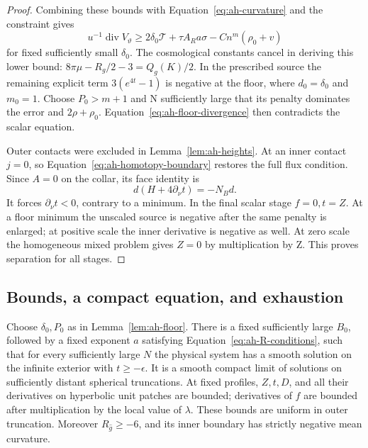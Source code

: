 \begin{proof}
Combining these bounds with
Equation~\eqref{eq:ah-curvature} and the constraint gives
\begin{equation}\label{eq:ah-floor-divergence}
 u^{-1}\operatorname{div}V_\vartheta
 \ge 2\delta_0\mathcal T+\tau A_Ra\sigma
                  -Cn^m(\rho_0+v)
\end{equation}
for fixed sufficiently small \(\delta_0\).
The cosmological constants cancel in deriving this lower bound:
\(8\pi\mu-R_g/2-3=Q_g(K)/2\).
In the prescribed source the remaining explicit term
\(3(e^{4t}-1)\) is negative at the floor, where \(d_0=\delta_0\)
and \(m_0=1\).  Choose \(P_0>m+1\) and N sufficiently large
that its penalty dominates the error and \(2\rho+\rho_0\).
Equation~\eqref{eq:ah-floor-divergence} then contradicts the
scalar equation.

Outer contacts were excluded in Lemma~\ref{lem:ah-heights}.
At an inner contact \(j=0\), so
Equation~\eqref{eq:ah-homotopy-boundary} restores the full flux
condition.  Since \(A=0\) on the collar, its face identity is
\[
 d(H+4\partial_\nu t)=-N_Bd.
\]
It forces \(\partial_\nu t<0\), contrary to a minimum.
In the final scalar stage \(f=0,t=Z\).  At a floor minimum the
unscaled source is negative after the same penalty is enlarged;
at positive scale the inner derivative is negative as well.
At zero scale the homogeneous mixed problem gives \(Z=0\) by
multiplication by Z.  This proves separation for all stages.
\end{proof}

\subsection{Bounds, a compact equation, and exhaustion}
\label{subsec:ah-existence}

\begin{proposition}\label{prop:ah-existence}
Choose \(\delta_0,P_0\) as in Lemma~\ref{lem:ah-floor}.
There is a fixed sufficiently large \(B_0\), followed by a fixed
exponent \(a\) satisfying Equation~\eqref{eq:ah-R-conditions}, such
that for every sufficiently large \(N\) the physical system has a
smooth solution on the infinite exterior with \(t\ge-\epsilon\).
It is a smooth compact limit of solutions on sufficiently distant
spherical truncations. At fixed profiles, \(Z,t,D\), and all their
derivatives on hyperbolic unit patches are bounded; derivatives
of \(f\) are bounded after multiplication by the local value of
\(\lambda\). These bounds are uniform in outer truncation.
Moreover \(R_{\widehat g}\ge-6\), and its inner boundary has strictly
negative mean curvature.
\end{proposition}

